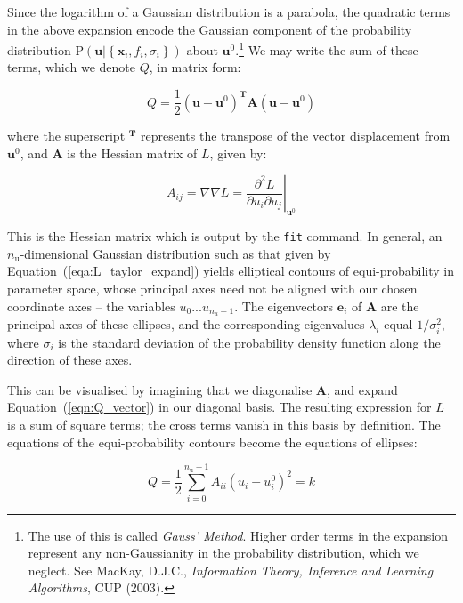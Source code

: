Since the logarithm of a Gaussian distribution is a parabola, the quadratic
terms in the above expansion encode the Gaussian component of the probability
distribution $\mathrm{P}\left( \mathbf{u} | \left\{ \mathbf{x}_i, f_i, \sigma_i
\right\} \right)$ about $\mathbf{u}^0$.\footnote{The use of this is called
\textit{Gauss' Method}. Higher order terms in the expansion represent any
non-Gaussianity in the probability distribution, which we neglect. See MacKay,
D.J.C., \textit{Information Theory, Inference and Learning Algorithms}, CUP
(2003).} We may write the sum of these terms, which we denote $Q$, in matrix
form:

\begin{equation}
Q = \frac{1}{2} \left(\mathbf{u} - \mathbf{u}^0\right)^\mathbf{T} \mathbf{A} \left(\mathbf{u} - \mathbf{u}^0\right)
\label{eqn:Q_vector}
\end{equation}

\noindent where the superscript $^\mathbf{T}$ represents the transpose of the
vector displacement from $\mathbf{u}^0$, and $\mathbf{A}$ is the Hessian matrix
of $L$, given by:

\begin{equation}
A_{ij} = \nabla\nabla L = \left.\frac{\partial^2 L}{\partial u_i \partial u_j}\right|_{\mathbf{u}^0}
\end{equation}

This is the Hessian matrix which is output by the {\tt fit} command. In
general, an $n_\mathrm{u}$-dimensional Gaussian distribution such as that given
by Equation~(\ref{eqa:L_taylor_expand}) yields elliptical contours of
equi-probability in parameter space, whose principal axes need not be aligned
with our chosen coordinate axes -- the variables $u_0 ... u_{n_u-1}$. The
eigenvectors $\mathbf{e}_i$ of $\mathbf{A}$ are the principal axes of these
ellipses, and the corresponding eigenvalues $\lambda_i$ equal $1/\sigma_i^2$,
where $\sigma_i$ is the standard deviation of the probability density function
along the direction of these axes.

This can be visualised by imagining that we diagonalise $\mathbf{A}$, and
expand Equation~(\ref{eqn:Q_vector}) in our diagonal basis. The resulting
expression for $L$ is a sum of square terms; the cross terms vanish in this
basis by definition. The equations of the equi-probability contours become the
equations of ellipses:

\begin{equation}
Q = \frac{1}{2} \sum_{i=0}^{n_\mathrm{u}-1} A_{ii} \left(u_i - u^0_i\right)^2 = k
\end{equation}

